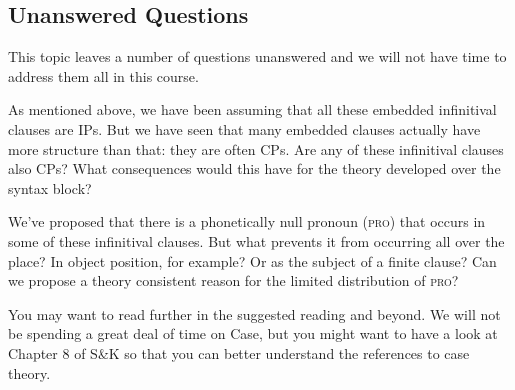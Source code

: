 \documentclass{article}
\begin{document}
\subsection{Unanswered Questions}
This topic leaves a number of questions unanswered and we will not have time to address them all in this course.

As mentioned above, we have been assuming that all these embedded infinitival clauses are IPs.
But we have seen that many embedded clauses actually have more structure than that: they are often CPs.
Are any of these infinitival clauses also CPs?
What consequences would this have for the theory developed over the syntax block?

We've proposed that there is a phonetically null pronoun (\textsc{pro}) that occurs in some of these infinitival clauses.
But what prevents it from occurring all over the place?
In object position, for example?
Or as the subject of a finite clause?
Can we propose a theory consistent reason for the limited distribution of \textsc{pro}?

You may want to read further in the suggested reading and beyond. We will not be spending a great deal of time on Case, but you might want to have a look at Chapter 8 of S\&K so that you can better understand the references to case theory.

%


\end{document}
